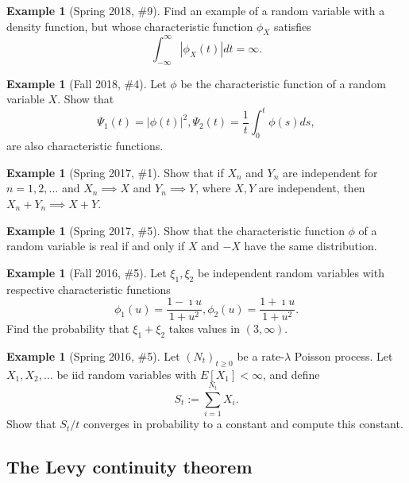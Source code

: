 \documentclass[12pt,reqno]{article}
\theoremstyle{plain}
\theoremstyle{definition}
\newtheorem{example}[theorem]{Example}
\begin{document}
\begin{example}[Spring 2018, \#9]
Find an example of a random variable with a density function, but whose 
characteristic function $\phi_X$ satisfies 
\[
\int_{-\infty}^{\infty} |\phi_X(t)| dt = \infty. 
\]
\end{example} 

\begin{example}[Fall 2018, \#4]
Let $\phi$ be the characteristic function of a random variable $X$. 
Show that 
\[
\Psi_1(t) = |\phi(t)|^2, \Psi_2(t) = \frac{1}{t} \int_0^t \phi(s) ds, 
\]
are also characteristic functions. 
\end{example} 

\begin{example}[Spring 2017, \#1]
Show that if $X_n$ and $Y_n$ are independent for $n = 1,2,\ldots$ and 
$X_n \implies X$ and $Y_n \implies Y$, where $X,Y$ are independent, then 
$X_n+Y_n \implies X+Y$. 
\end{example} 

\begin{example}[Spring 2017, \#5]
Show that the characteristic function $\phi$ of a random variable is 
real if and only if $X$ and $-X$ have the same distribution. 
\end{example} 

\begin{example}[Fall 2016, \#5]
Let $\xi_1,\xi_2$ be independent random variables with respective 
characteristic functions 
\[
\phi_1(u) = \frac{1-\imath u}{1+u^2}, \phi_2(u) = \frac{1+\imath u}{1+u^2}. 
\]
Find the probability that $\xi_1+\xi_2$ takes values in $(3, \infty)$. 
\end{example} 

\begin{example}[Spring 2016, \#5]
Let $(N_t)_{t \geq 0}$ be a rate-$\lambda$ Poisson process. Let 
$X_1,X_2,\ldots$ be iid random variables with $E[X_1] < \infty$, and 
define 
\[
S_t := \sum_{i=1}^{N_t} X_i. 
\]
Show that $S_t / t$ converges in probability to a constant and 
compute this constant. 
\end{example} 

\subsection{The Levy continuity theorem} 
\end{document}

